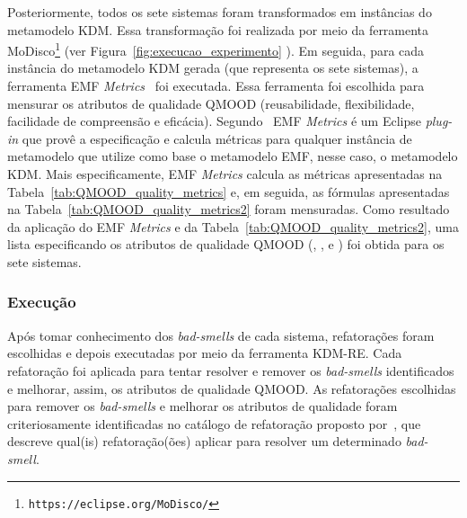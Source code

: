 Posteriormente, todos os sete sistemas foram transformados em instâncias do metamodelo KDM. Essa transformação foi realizada por meio da ferramenta MoDisco\footnote{\texttt{https://eclipse.org/MoDisco/}} (ver Figura~\ref{fig:execucao_experimento} ). Em seguida, para cada instância do metamodelo KDM gerada (que representa os sete sistemas), a ferramenta EMF \textit{Metrics}~\cite{Arendt_2012, Thorsten_2010_durelli} foi executada. Essa ferramenta foi escolhida para mensurar os atributos de qualidade QMOOD (reusabilidade, flexibilidade, facilidade de compreensão e eficácia). Segundo~ EMF \textit{Metrics} é um Eclipse \textit{plug-in} que provê a especificação e calcula métricas para qualquer instância de metamodelo que utilize como base o metamodelo EMF, nesse caso, o metamodelo KDM. Mais especificamente, EMF \textit{Metrics} calcula as métricas apresentadas na Tabela~\ref{tab:QMOOD_quality_metrics} e, em seguida, as fórmulas apresentadas na Tabela~\ref{tab:QMOOD_quality_metrics2} foram mensuradas. Como resultado da aplicação do EMF \textit{Metrics} e da Tabela~\ref{tab:QMOOD_quality_metrics2}, uma lista especificando os atributos de qualidade QMOOD (, ,  e ) foi obtida para os sete sistemas.

\subsubsection{Execução}


Após tomar conhecimento dos \textit{bad-smells} de cada sistema, refatorações foram escolhidas e depois executadas por meio da ferramenta KDM-RE. Cada refatoração foi aplicada para tentar resolver e remover os \textit{bad-smells} identificados e melhorar, assim, os atributos de qualidade QMOOD. As refatorações escolhidas para remover os \textit{bad-smells} e melhorar os atributos de qualidade foram criteriosamente identificadas no catálogo de refatoração proposto por~, que descreve qual(is) refatoração(ões) aplicar para resolver um determinado \textit{bad-smell}. 


